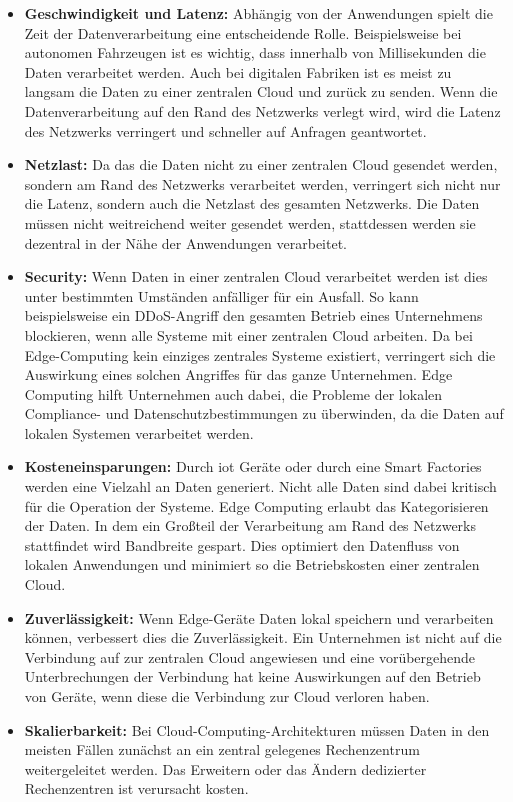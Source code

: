\documentclass[runningheads]{llncs}
\numberwithin{figure}{section}
\begin{document}
\begin{itemize}
  \item \textbf{Geschwindigkeit und Latenz:} Abhängig von der Anwendungen spielt die Zeit der Datenverarbeitung eine
  entscheidende Rolle. Beispielsweise bei autonomen Fahrzeugen ist es wichtig, dass innerhalb von Millisekunden die Daten
  verarbeitet werden. Auch bei digitalen Fabriken ist es meist zu langsam die Daten zu einer zentralen Cloud und zurück
  zu senden. 
  Wenn die Datenverarbeitung auf den Rand des Netzwerks verlegt wird, wird die Latenz des Netzwerks verringert und schneller
  auf Anfragen geantwortet. 
  \item \textbf{Netzlast:} Da das die Daten nicht zu einer zentralen Cloud gesendet werden, sondern am Rand des Netzwerks 
  verarbeitet werden, verringert sich nicht nur die Latenz, sondern auch die Netzlast des gesamten Netzwerks. 
  Die Daten müssen nicht weitreichend weiter gesendet werden, stattdessen werden sie 
  dezentral in der Nähe der Anwendungen verarbeitet.
  \item \textbf{Security:} Wenn Daten in einer zentralen Cloud verarbeitet werden ist dies unter bestimmten Umständen anfälliger
  für ein Ausfall.
  So kann beispielsweise ein DDoS-Angriff den gesamten Betrieb eines Unternehmens blockieren, wenn alle Systeme mit einer zentralen
  Cloud arbeiten. Da bei Edge-Computing kein einziges zentrales Systeme existiert, verringert sich die Auswirkung eines solchen
  Angriffes für das ganze Unternehmen.  
  Edge Computing hilft Unternehmen auch dabei, die Probleme der lokalen Compliance- und Datenschutzbestimmungen zu überwinden,
  da die Daten auf lokalen Systemen verarbeitet werden.
  \item \textbf{Kosteneinsparungen:} Durch \acrfull{iot} Geräte oder durch eine Smart Factories werden
  eine Vielzahl an Daten generiert. Nicht alle Daten sind dabei kritisch für die Operation der Systeme. Edge Computing erlaubt
  das Kategorisieren der Daten. In dem ein Großteil der Verarbeitung am Rand des Netzwerks stattfindet wird Bandbreite gespart.
  Dies optimiert den Datenfluss von lokalen Anwendungen und minimiert so die Betriebskosten einer zentralen Cloud.
  \item \textbf{Zuverlässigkeit:} Wenn Edge-Geräte Daten lokal speichern und verarbeiten können, verbessert dies die Zuverlässigkeit.
  Ein Unternehmen ist nicht auf die Verbindung auf zur zentralen Cloud angewiesen und eine vorübergehende Unterbrechungen der 
  Verbindung hat keine Auswirkungen auf den Betrieb von Geräte, wenn diese die Verbindung zur Cloud verloren haben.
  \item \textbf{Skalierbarkeit:}
  Bei Cloud-Computing-Architekturen müssen Daten in den meisten Fällen zunächst an ein zentral gelegenes Rechenzentrum
  weitergeleitet werden. Das Erweitern oder das Ändern dedizierter Rechenzentren ist verursacht kosten. 
\end{itemize}
\newpage
\end{document}

